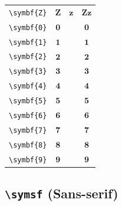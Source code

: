 \documentclass[12pt,a4paper]{article}
\begin{document}
\begin{longtable}{|c|c|c|c|}
\verb|\symbf{Z}| & $\symbf{Z}$ & $\symbf{z}$ & $ 𝐙 𝐳 $ \\
\verb|\symbf{0}| & $\symbf{0}$ & & $ 𝟎 $ \\
\verb|\symbf{1}| & $\symbf{1}$ & & $ 𝟏 $ \\
\verb|\symbf{2}| & $\symbf{2}$ & & $ 𝟐 $ \\
\verb|\symbf{3}| & $\symbf{3}$ & & $ 𝟑 $ \\
\verb|\symbf{4}| & $\symbf{4}$ & & $ 𝟒 $ \\
\verb|\symbf{5}| & $\symbf{5}$ & & $ 𝟓 $ \\
\verb|\symbf{6}| & $\symbf{6}$ & & $ 𝟔 $ \\
\verb|\symbf{7}| & $\symbf{7}$ & & $ 𝟕 $ \\
\verb|\symbf{8}| & $\symbf{8}$ & & $ 𝟖 $ \\
\verb|\symbf{9}| & $\symbf{9}$ & & $ 𝟗 $ \\
\hline
\end{longtable}

\newpage

\subsection*{\texttt{\textbackslash{}symsf} (Sans-serif)}
\end{document}
